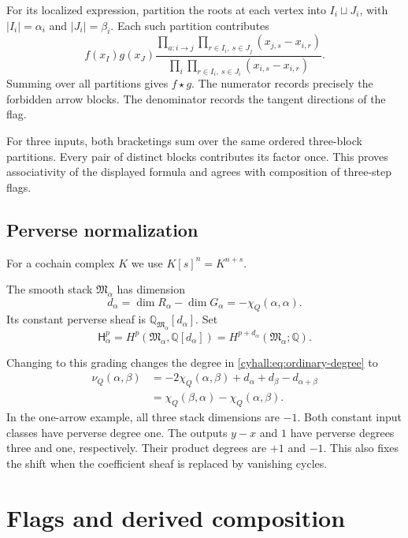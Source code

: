 For its localized expression, partition the roots at each vertex
into $I_i\sqcup J_i$, with $|I_i|=\alpha_i$ and $|J_i|=\beta_i$.
Each such partition contributes
\begin{equation}\label{cyhall:eq:shuffle}
 f(x_I)g(x_J)
 \frac{\displaystyle\prod_{a:i\to j}
        \prod_{r\in I_i,\ s\in J_j}(x_{j,s}-x_{i,r})}
      {\displaystyle\prod_i
        \prod_{r\in I_i,\ s\in J_i}(x_{i,s}-x_{i,r})}.
\end{equation}
Summing over all partitions gives $f\star g$.
The numerator records precisely the forbidden arrow blocks.
The denominator records the tangent directions of the flag.

For three inputs, both bracketings sum over the same ordered
three-block partitions. Every pair of distinct blocks contributes
its factor once. This proves associativity of the displayed
formula and agrees with composition of three-step flags.

\subsection{Perverse normalization}

For a cochain complex $K$ we use $K[s]^n=K^{n+s}$.

The smooth stack $\mathfrak M_\alpha$ has dimension
\[
 d_\alpha=\dim R_\alpha-\dim G_\alpha
          =-\chi_Q(\alpha,\alpha).
\]
Its constant perverse sheaf is
$\mathbb Q_{\mathfrak M_\alpha}[d_\alpha]$.
Set
\[
 \mathsf H^p_\alpha=
 H^p(\mathfrak M_\alpha,\mathbb Q[d_\alpha])
 =H^{p+d_\alpha}(\mathfrak M_\alpha;\mathbb Q).
\]

Changing to this grading changes the degree in
\eqref{cyhall:eq:ordinary-degree} to
\begin{equation}\label{cyhall:eq:perverse-degree}
 \begin{split}
 \nu_Q(\alpha,\beta)
 &=-2\chi_Q(\alpha,\beta)+d_\alpha+d_\beta-d_{\alpha+\beta}\\
 &=\chi_Q(\beta,\alpha)-\chi_Q(\alpha,\beta).
 \end{split}
\end{equation}
In the one-arrow example, all three stack dimensions are $-1$.
Both constant input classes have perverse degree one.
The outputs $y-x$ and $1$ have perverse degrees three and one,
respectively. Their product degrees are $+1$ and $-1$.
This also fixes the shift when the coefficient sheaf is replaced
by vanishing cycles.

\section{Flags and derived composition}
\label{cyhall:sec:flags}

